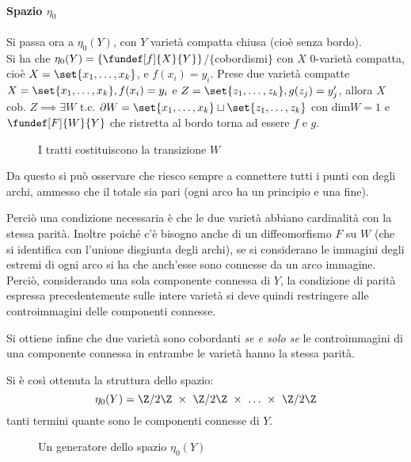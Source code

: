 \paragraph{Spazio $\eta_0$}
Si passa ora a $\eta_0(Y)$, con $Y$ varietà compatta chiusa (cioè senza bordo). \\
Si ha che $\eta_0(Y) = \{\fundef[f]{X}{Y}\}$/$\{$cobordismi$\}$ con $X$ 0-varietà compatta, cioè $X = \set{x_1, \dots, x_k}$, e $f(x_i) = y_i$.
Prese due varietà compatte $X = \set{x_1, \dots, x_k}, f(x_i) = y_i$ e $Z = \set{z_1, \dots, z_k}, g(z_j) = y'_j$, allora $X$ cob. $Z \implies \exists W$ t.c. $\partial W = \set{x_1, \dots, x_k}\sqcup\set{z_1, \dots, z_k}$ con dim$W = 1$ e $\fundef[F]{W}{Y}$ che ristretta al bordo torna ad essere $f$ e $g$.
\begin{es}

\begin{figure}[h]
\centering

\caption{I tratti costituiscono la transizione $W$}
\end{figure}
Da questo si può osservare che riesco sempre a connettere tutti i punti con degli archi, ammesso che il totale sia pari (ogni arco ha un principio e una fine).
\end{es}
Perciò una condizione necessaria è che le due varietà abbiano cardinalità con la stessa parità. Inoltre poiché c'è bisogno anche di un diffeomorfismo $F$ su $W$ (che si identifica con l'unione disgiunta degli archi), se si considerano le immagini degli estremi di ogni arco si ha che anch'esse sono connesse da un arco immagine. Perciò, considerando una sola componente connessa di $Y$, la condizione di parità espressa precedentemente sulle intere varietà si deve quindi restringere alle controimmagini delle componenti connesse.

Si ottiene infine che due varietà sono cobordanti \emph{se e solo se} le controimmagini di una componente connessa in entrambe le varietà hanno la stessa parità.

Si è così ottenuta la struttura dello spazio: 
\begin{equation*}
\eta_0(Y) = \Z/2\Z~\times~\Z/2\Z~\times~\dots~\times~\Z/2\Z
\end{equation*}
tanti termini quante sono le componenti connesse di $Y$.

\begin{figure}[h]
\centering

\caption{Un generatore dello spazio $\eta_0(Y)$}
\end{figure}

